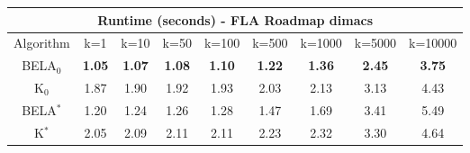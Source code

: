 \begin{tabular}{c|cccccccc}\toprule
\multicolumn{9}{c}{Runtime (seconds) - FLA Roadmap dimacs}\\ \midrule
Algorithm & k=1 & k=10 & k=50 & k=100 & k=500 & k=1000 & k=5000 & k=10000 \\ \midrule
BELA$_0$ & \textbf{1.05} & \textbf{1.07} & \textbf{1.08} & \textbf{1.10} & \textbf{1.22} & \textbf{1.36} & \textbf{2.45} & \textbf{3.75} \\
K$_0$ & 1.87 & 1.90 & 1.92 & 1.93 & 2.03 & 2.13 & 3.13 & 4.43 \\
BELA$^*$ & 1.20 & 1.24 & 1.26 & 1.28 & 1.47 & 1.69 & 3.41 & 5.49 \\
K$^*$ & 2.05 & 2.09 & 2.11 & 2.11 & 2.23 & 2.32 & 3.30 & 4.64 \\ \bottomrule 
\end{tabular}
